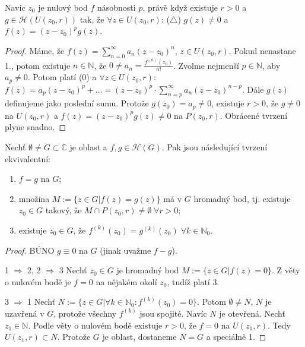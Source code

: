 \begin{note}
Navíc $z_0$ je nulový bod $f$ násobnosti $p$, právě když existuje $r>0$ a $g \in \mathcal{H}(U(z_0,r))$ tak, že $\forall z \in U(z_0,r)$: ($\triangle$) $g(z) \neq 0$ a $f(z)=(z-z_0)^pg(z)$.
\end{note}

\begin{proof}
Máme, že $f(z)=\sum\limits _{n=0} ^{\infty} a_n(z-z_0)^n$, $z \in U(z_0,r)$. Pokud nenastane 1., potom existuje $n \in \mathbb{N}$, že $0 \neq a_n=\frac{f^{(n)}(z_0)}{n!}$. Zvolme nejmenší $p \in \mathbb{N}$, aby $a_p \neq 0$. Potom platí (0) a $\forall z \in U(z_0,r)$: $f(z)=a_p(z-z_0)^p + \ldots = (z-z_0)^p \cdot \sum\limits_{n=p}^\infty a_n(z-z_0)^{n-p}$. Dále $g(z)$ definujeme jako poslední sumu.%
Protože $g(z_0)=a_p \neq 0$, existuje $r>0$, že $g \neq 0$ na $U(z_0,r)$ a $f(z)=(z-z_0)^pg(z) \neq 0$ na $P(z_0,r)$. Obrácené tvrzení plyne snadno.
\end{proof}

\begin{theorem}
Nechť $\emptyset \neq G \subset \mathbb{C}$ je oblast a $f,g \in \mathcal{H}(G)$. Pak jsou následující tvrzení ekvivalentní:
\begin{enumerate}
\item $f=g$ na $G$;
\item množina $M:=\{z \in G | f(z)=g(z) \}$ má v $G$ hromadný bod, tj. existuje $z_0 \in G$ takový, že $M \cap P(z_0,r) \neq \emptyset  \; \forall  r>0$;
\item existuje $z_0 \in G$, že $f^{(k)}(z_0)=g^{(k)}(z_0) \; \forall k \in \mathbb{N}_0$.
\end{enumerate}
\end{theorem}

\begin{proof}
BÚNO $g \equiv 0$ na $G$ (jinak uvažme $f-g$).

1 $\Rightarrow$ 2, 2 $\Rightarrow$ 3 Nechť $z_0 \in G$ je hromadný bod $M:=\{z \in G | f(z)=0 \}$. Z věty o nulovém bodě je $f=0$ na nějakém okolí $z_0$, tudíž platí 3.

3 $\Rightarrow$ 1 Nechť $N:=\{z \in G | \forall k \in \mathbb{N}_0: f^{(k)}(z_0)=0 \}$. Potom $\emptyset  \neq N$, $N$ je uzavřená v $G$, protože všechny $f^{(k)}$ jsou spojité. Navíc $N$ je otevřená. Nechť $z_1 \in \mathbb{N}$. Podle věty o nulovém bodě existuje $r>0$, že $f=0$ na $U(z_1,r)$. Tedy $U(z_1,r) \subset N$. Protože $G$ je oblast, dostaneme $N=G$ a speciálně 1.
\end{proof}

